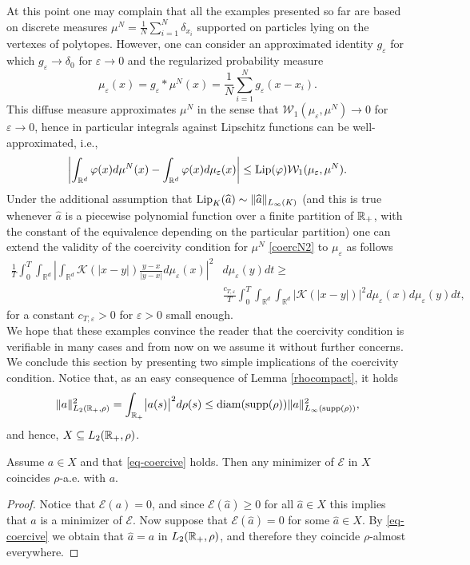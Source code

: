 At this point one may complain that all the examples presented so far are based on discrete measures $\mu^N=\frac{1}{N} \sum_{i=1}^N\delta_{x_i}$ supported on particles lying on the vertexes of polytopes. However, one can consider an approximated identity $g_\varepsilon$ for which $g_\varepsilon \to \delta_0$ for $\varepsilon \to 0$ and  the regularized probability measure
$$
\mu_\varepsilon(x) = g_\varepsilon * \mu^N (x)= \frac{1}{N} \sum_{i=1}^N g_\varepsilon (x-x_i).
$$
This diffuse measure approximates $\mu^N$ in the sense that $\mathcal W_1(\mu_\varepsilon,\mu^N) \to 0$ for $\varepsilon \to 0$, hence in particular integrals against Lipschitz functions can be well-approximated, i.e.,
$$
\left | \int_{\mathbb R^d} \varphi(x) d \mu^N(x) -\int_{\mathbb R^d}  \varphi(x) d \mu_\varepsilon(x) \right | \leq \textup{Lip}(\varphi) \mathcal W_1(\mu_\varepsilon,\mu^N) .
$$
Under the additional assumption that $\textup{Lip}_K(\widehat a) \sim \| \widehat a \|_{L_\infty(K)}$ (and this is true whenever $\widehat a$ is a piecewise polynomial function over a finite partition of $\mathbb{R}_+$, with the constant of the equivalence depending on the particular partition) one can extend the validity of the coercivity condition for $\mu^N$ \eqref{coercN2} 
to $\mu_\varepsilon$ as follows
\begin{align*}
\frac{1}{T} \int_0^T \int_{\mathbb R^d}  \left | \int_{\mathbb R^d}  \mathcal K(|x-y|) \frac{y-x}{|y-x|} d \mu_\varepsilon(x) \right |^2 &d\mu_\varepsilon(y) dt \geq \\
&\frac{c_{T,\varepsilon }}{T} \int_0^T  \int_{\mathbb R^d}  \int_{\mathbb R^d}  |\mathcal K(|x-y|)|^2    d\mu_\varepsilon(x) d\mu_\varepsilon(y)dt,
\end{align*}
for a constant $c_{T,\varepsilon }>0$ for $\varepsilon>0$ small enough.
\\

We hope that these examples convince the reader that the coercivity condition is verifiable in many cases and from now on we assume it without further concerns. We conclude this section by presenting two simple implications of the coercivity condition.
Notice that, as an easy consequence of Lemma \ref{rhocompact}, it holds
\begin{align}\label{eq:inftyimplyl2}
\|a\|^2_{L_2(\mathbb{R}_+,\rho)} = \int_{\mathbb{R}_+} \bigl|a(s)\bigr|^2 d\rho(s) \leq \operatorname{diam}(\operatorname{supp}(\rho))\|a\|^2_{L_{\infty}(\operatorname{supp}(\rho))},
\end{align}
and hence, $X\subseteq L_2(\mathbb{R}_+,\rho)$. 

\begin{proposition}\label{uniquemin}
Assume $a \in X$ and that \eqref{eq-coercive} holds. Then any minimizer of $\mathcal E$ in $X$ coincides $\rho$-a.e. with $a$.
\end{proposition}
\begin{proof}
Notice that $\mathcal E(a)=0$, and since $\mathcal E(\widehat a)\geq 0$ for all $\widehat a\in X$ this implies that $a$ is a minimizer of $\mathcal E$. Now suppose that $ \mathcal E(\widehat a)=0$ for some $\widehat a\in X$. By \eqref{eq-coercive} we obtain that $\widehat a=a$ in $L_2(\mathbb{R}_+,\rho)$, and therefore they coincide $\rho$-almost everywhere. %
\end{proof}
